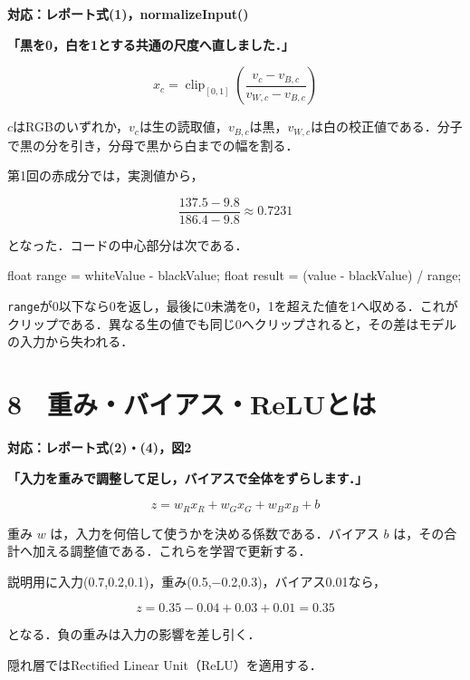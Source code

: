 \documentclass[
  14pt,
  a5paper,
]{extarticle}
\newenvironment{Shaded}{}{}
\newcommand{\DataTypeTok}[1]{\textcolor[rgb]{0.56,0.13,0.00}{#1}}
\newcommand{\NormalTok}[1]{#1}
\newcommand{\OperatorTok}[1]{\textcolor[rgb]{0.40,0.40,0.40}{#1}}
\begin{document}
\textbf{対応：レポート式(1)，normalizeInput()}

\textbf{「黒を0，白を1とする共通の尺度へ直しました．」}

\[x_c=\operatorname{clip}_{[0,1]}
\left(\frac{v_c-v_{B,c}}{v_{W,c}-v_{B,c}}\right)\]

\(c\)はRGBのいずれか，\(v_c\)は生の読取値，\(v_{B,c}\)は黒，\(v_{W,c}\)は白の校正値である．分子で黒の分を引き，分母で黒から白までの幅を割る．

第1回の赤成分では，実測値から，

\[\frac{137.5-9.8}{186.4-9.8}\approx0.7231\]

となった．コードの中心部分は次である．

\begin{Shaded}
\begin{Highlighting}[]
\DataTypeTok{float}\NormalTok{ range }\OperatorTok{=}\NormalTok{ whiteValue }\OperatorTok{{-}}\NormalTok{ blackValue}\OperatorTok{;}
\DataTypeTok{float}\NormalTok{ result }\OperatorTok{=}
  \OperatorTok{(}\NormalTok{value }\OperatorTok{{-}}\NormalTok{ blackValue}\OperatorTok{)} \OperatorTok{/}\NormalTok{ range}\OperatorTok{;}
\end{Highlighting}
\end{Shaded}

\texttt{range}が0以下なら0を返し，最後に0未満を0，1を超えた値を1へ収める．これがクリップである．異なる生の値でも同じ0へクリップされると，その差はモデルの入力から失われる．

\newpage

\section{8　重み・バイアス・ReLUとは}\label{ux91cdux307fux30d0ux30a4ux30a2ux30b9reluux3068ux306f}

\textbf{対応：レポート式(2)・(4)，図2}

\textbf{「入力を重みで調整して足し，バイアスで全体をずらします．」}

\[z=w_Rx_R+w_Gx_G+w_Bx_B+b\]

重み \(w\) は，入力を何倍して使うかを決める係数である．バイアス \(b\)
は，その合計へ加える調整値である．これらを学習で更新する．

説明用に入力(0.7,0.2,0.1)，重み(0.5,−0.2,0.3)，バイアス0.01なら，

\[z=0.35-0.04+0.03+0.01=0.35\]

となる．負の重みは入力の影響を差し引く．

隠れ層ではRectified Linear Unit（ReLU）を適用する．
\end{document}
